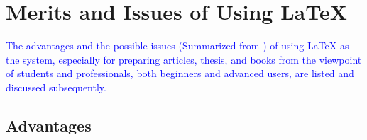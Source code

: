 \documentclass[phd,showgrids]{ndsu-thesis-2022}
\newcommand\italk[1]{\textcolor{blue}{#1}}  %
\newcommand\lx{\LaTeX\xspace}
\begin{document}
\kant[9]

\section{Merits and Issues of Using \lx}
\italk{The advantages and the possible issues (Summarized from \citet{cannayen2011latex}) of using \lx as the system, especially for preparing articles, thesis, and books from the viewpoint of students and professionals, both beginners and advanced users, are listed and discussed subsequently.} 

\subsection{Advantages}
\end{document}
